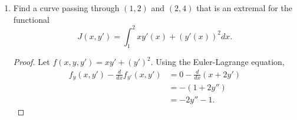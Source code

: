 \documentclass{article}
\begin{document}
\begin{enumerate}
\begin{enumerate}
\begin{align*}
\begin{cases}
                                    \begin{matrix}
                                          -6(x-a)(x-b)^3 - 18(x-a)^2(x-b)^2 \\
                                          - 6(x-a)^3(x-b)
                                    \end{matrix} &
                                    \text{if } a < x < b                             \\
                                    0                          & \text{if } b \leq x
                              \end{cases} \\
                        \end{align*}
                  \item If $x_o$ is a point of $[x_1, x_2]$ such that $H(x_o)
                              \neq 0$, show how to choose $\eta (x)$ so that
                        hypothesis \eqref{eq:5.5_e1} is violated.
                        \begin{proof}
                              Any $\eta$ that contains no zeroes in
                              $(a,b)$ will violate \eqref{eq:5.5_e1} if there
                              exists some $x_o$ in which $H(x_o)\neq 0$. This
                              is because $H(x_o)\eta(x_o)\neq 0$, which implies
                              that the integral cannot be 0. %
                        \end{proof}
            \end{enumerate}
            \setcounter{enumi}{2}
      \item Find a curve passing through $(1,2)$ and $(2,4)$ that is an extremal
            for the functional
            \begin{equation}
                  J(x, y') = \int_1^2xy'(x)+(y'(x))^2dx.
            \end{equation}
            \begin{proof}
                  Let $f(x, y, y')=xy'+(y')^2$. Using the Euler-Lagrange equation,
                  \begin{align*}
                        f_y(x, y') - \frac{d}{dx}f_{y'}(x, y')
                         & = 0 - \frac{d}{dx}(x+2y') \\
                         & = -(1+2y'')               \\
                         & = -2y'' - 1.
                  \end{align*}

\end{proof}
\end{enumerate}
\end{document}
